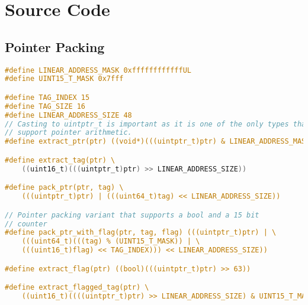 \chapter{Source Code}
\section{Pointer Packing}
\begin{lstlisting}[language=C,caption={Macros for performing pointer packing operations}]
#define LINEAR_ADDRESS_MASK 0xffffffffffffUL
#define UINT15_T_MASK 0x7fff

#define TAG_INDEX 15
#define TAG_SIZE 16
#define LINEAR_ADDRESS_SIZE 48
// Casting to uintptr_t is important as it is one of the only types that 
// support pointer arithmetic.
#define extract_ptr(ptr) ((void*)(((uintptr_t)ptr) & LINEAR_ADDRESS_MASK))

#define extract_tag(ptr) \ 
    ((uint16_t)(((uintptr_t)ptr) >> LINEAR_ADDRESS_SIZE))

#define pack_ptr(ptr, tag) \
    (((uintptr_t)ptr) | (((uint64_t)tag) << LINEAR_ADDRESS_SIZE))

// Pointer packing variant that supports a bool and a 15 bit
// counter
#define pack_ptr_with_flag(ptr, tag, flag) (((uintptr_t)ptr) | \
    (((uint64_t)(((tag) % (UINT15_T_MASK)) | \
    (((uint16_t)flag) << TAG_INDEX))) << LINEAR_ADDRESS_SIZE))

#define extract_flag(ptr) ((bool)(((uintptr_t)ptr) >> 63))

#define extract_flagged_tag(ptr) \
    ((uint16_t)((((uintptr_t)ptr) >> LINEAR_ADDRESS_SIZE) & UINT15_T_MASK))
\end{lstlisting}

